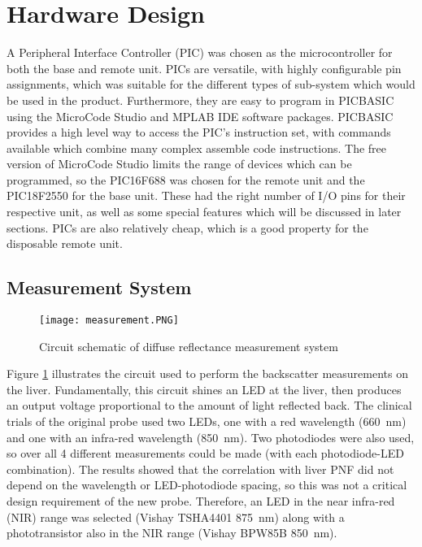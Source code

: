 \section{Hardware Design}

A Peripheral Interface Controller (PIC) was chosen as the microcontroller for both the base and remote unit. PICs are versatile, with highly configurable pin assignments, which was suitable for the different types of sub-system which would be used in the product. Furthermore, they are easy to program in PICBASIC using the MicroCode Studio and MPLAB IDE software packages. PICBASIC provides a high level way to access the PIC's instruction set, with commands available which combine many complex assemble code instructions. The free version of MicroCode Studio limits the range of devices which can be programmed, so the PIC16F688 \cite{pic16f688} was chosen for the remote unit and the PIC18F2550 \cite{pic18f2550} for the base unit. These had the right number of I/O pins for their respective unit, as well as some special features which will be discussed in later sections. PICs are also relatively cheap, which is a good property for the disposable remote unit.\\

\subsection{Measurement System}
\begin{figure}[htbp]
	\centering
	\texttt{[image: measurement.PNG]}
	\caption{Circuit schematic of diffuse reflectance measurement system}
	\label{fig: measurement schematic}
\end{figure}

Figure \ref{fig: measurement schematic} illustrates the circuit used to perform the backscatter measurements on the liver. Fundamentally, this circuit shines an LED at the liver, then produces an output voltage proportional to the amount of light reflected back. The clinical trials of the original probe \cite{Robertson} used two LEDs, one with a red wavelength (\SI{660}{\nano\metre}) and one with an infra-red wavelength (\SI{850}{\nano\metre}). Two photodiodes were also used, so over all 4 different measurements could be made (with each photodiode-LED combination). The results showed that the correlation with liver PNF did not depend on the wavelength or LED-photodiode spacing, so this was not a critical design requirement of the new probe. Therefore, an LED in the near infra-red (NIR) range was selected (Vishay TSHA4401 \cite{tsha4401} \SI{875}{\nano\metre}) along with a phototransistor also in the NIR range (Vishay BPW85B \cite{bpw85b} \SI{850}{\nano\metre}).\\

